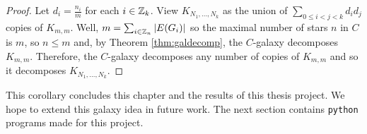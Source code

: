 \begin{proof}
Let $d_{i}=\frac{n_{i}}{m}$ for each $i\in \mathbb{Z}_{k}$. View $K_{N_{1},\hdots,N_{k}}$ as the union of $\sum\limits_{0\leq i<j<k} d_{i}d_{j}$ copies of $K_{m,m}$. Well, $m=\sum_{i\in \mathbb{Z}_{n}} |E(G_{i})|$ so the maximal number of stars $n$ in $C$ is $m$, so $n\leq m$ and, by Theorem \ref{thm:galdecomp}, the $C$-galaxy decomposes $K_{m,m}$. Therefore, the $C$-galaxy decomposes any number of copies of $K_{m,m}$ and so it decomposes $K_{N_{1},\hdots,N_{k}}$.
\end{proof}
This corollary concludes this chapter and the results of this thesis project. We hope to extend this galaxy idea in future work. The next section contains \verb|python| programs made for this project.